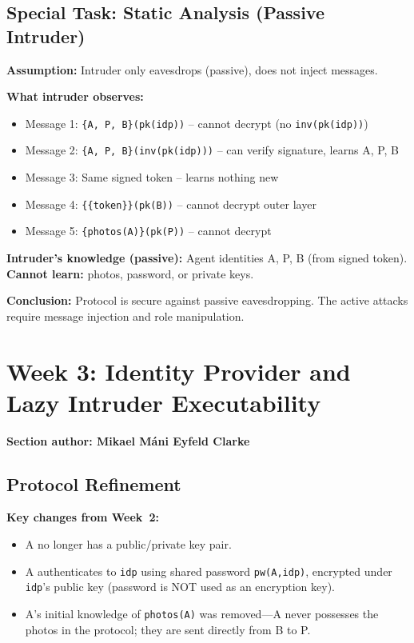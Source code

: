 \documentclass[11pt,a4paper]{article}
\newcommand{\sectionauthor}[1]{\noindent\textbf{Section author: #1}\par\medskip}
\begin{document}
\subsection{Special Task: Static Analysis (Passive Intruder)}
\textbf{Assumption:} Intruder only eavesdrops (passive), does not inject messages.

\textbf{What intruder observes:}
\begin{itemize}[leftmargin=*]
  \item Message 1: \texttt{\{A, P, B\}(pk(idp))} -- cannot decrypt (no \texttt{inv(pk(idp))})
  \item Message 2: \texttt{\{A, P, B\}(inv(pk(idp)))} -- can verify signature, learns A, P, B
  \item Message 3: Same signed token -- learns nothing new
  \item Message 4: \texttt{\{\{token\}\}(pk(B))} -- cannot decrypt outer layer
  \item Message 5: \texttt{\{photos(A)\}(pk(P))} -- cannot decrypt
\end{itemize}

\textbf{Intruder's knowledge (passive):} Agent identities A, P, B (from signed token). \textbf{Cannot learn:} photos, password, or private keys.

\textbf{Conclusion:} Protocol is secure against passive eavesdropping. The active attacks require message injection and role manipulation.

\section{Week 3: Identity Provider and Lazy Intruder Executability}
\sectionauthor{Mikael Máni Eyfeld Clarke}

\subsection{Protocol Refinement}
\textbf{Key changes from Week~2:}
\begin{itemize}[leftmargin=*]
  \item A no longer has a public/private key pair.
  \item A authenticates to \texttt{idp} using shared password \texttt{pw(A,idp)},
        encrypted under \texttt{idp}'s public key (password is NOT used as an encryption key).
  \item A's initial knowledge of \texttt{photos(A)} was removed---A never possesses the
        photos in the protocol; they are sent directly from B to P.
\end{itemize}
\end{document}
